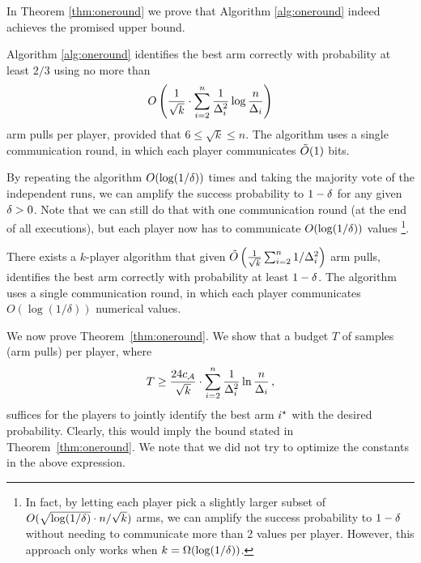 \documentclass{article} %
\newcommand{\cA}{c_\mathcal{A}}
\begin{document}
In Theorem \ref{thm:oneround} we prove that Algorithm \ref{alg:oneround} indeed
achieves the promised upper bound.

\begin{theorem} \label{thm:oneround}
Algorithm \ref{alg:oneround} identifies the best arm correctly with probability at least $2/3$ using no more than
\begin{align*}%
	\OO {
		\frac{1}{\sqrt{k}} \cdot
		\sum_{i=2}^{n} \frac{1}{\Del_i^2} \log \frac{n}{\Del_i} 
	} 
\end{align*}
arm pulls per player, provided that $6 \le \sqrt{k} \le n$.
The algorithm uses a single communication round, in which each player communicates $\tilde{O}(1)$ bits.
\end{theorem}


By repeating the algorithm $O(\log(1/\delta))$ times and taking the majority vote of the independent runs, we can amplify the success probability to $1-\delta$ for any given $\delta > 0$. 
Note that we can still do that with one communication round (at the end of all executions), but each player now has to communicate $O(\log(1/\delta))$ values%
\footnote{In fact, by letting each player pick a slightly larger subset of $O(\sqrt{\log (1/\delta)} \cdot n/\sqrt{k})$ arms, we can amplify the success probability to $1-\delta$ without needing to communicate more than 2 values per player. However, this approach only works when $k = \Omega(\log(1/\delta))$.}. 


\begin{theorem}
There exists a $k$-player algorithm that given
$
	\tilde{O}\left( \tfrac{1}{\sqrt{k}} \sum_{i=2}^{n} 1/\Delta_i^2 \right)
$
arm pulls, identifies the best arm correctly with probability at least $1-\delta$.
The algorithm uses a single communication round, in which each player communicates $O(\log(1/\delta))$ numerical values.
\end{theorem}




We now prove Theorem~\ref{thm:oneround}.
We show that a budget $T$ of samples (arm pulls) per player, where%
\begin{align} \label{eq:T}
	T 
	\ge \frac{24 \cA}{\sqrt{k}} \cdot
			\sum_{i=2}^{n} \frac{1}{\Del_i^2} \ln \frac{n}{\Del_i} \,,
\end{align}
suffices for the players to jointly identify the best arm $i^\star$ with the desired probability.
Clearly, this would imply the bound stated in Theorem~\ref{thm:oneround}. 
We note that we did not try to optimize the constants in the above expression. 
\end{document}

